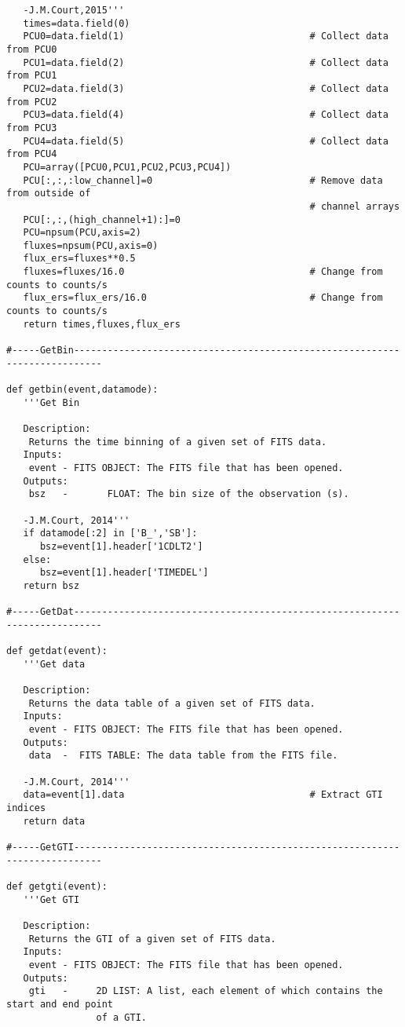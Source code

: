 \begin{verbatim}
   -J.M.Court,2015'''
   times=data.field(0)
   PCU0=data.field(1)                                 # Collect data from PCU0
   PCU1=data.field(2)                                 # Collect data from PCU1
   PCU2=data.field(3)                                 # Collect data from PCU2
   PCU3=data.field(4)                                 # Collect data from PCU3
   PCU4=data.field(5)                                 # Collect data from PCU4
   PCU=array([PCU0,PCU1,PCU2,PCU3,PCU4])
   PCU[:,:,:low_channel]=0                            # Remove data from outside of
                                                      # channel arrays
   PCU[:,:,(high_channel+1):]=0
   PCU=npsum(PCU,axis=2)
   fluxes=npsum(PCU,axis=0)
   flux_ers=fluxes**0.5
   fluxes=fluxes/16.0                                 # Change from counts to counts/s
   flux_ers=flux_ers/16.0                             # Change from counts to counts/s
   return times,fluxes,flux_ers

#-----GetBin---------------------------------------------------------------------------

def getbin(event,datamode):
   '''Get Bin
   
   Description:
    Returns the time binning of a given set of FITS data.
   Inputs:
    event - FITS OBJECT: The FITS file that has been opened.
   Outputs:
    bsz   -       FLOAT: The bin size of the observation (s).
    
   -J.M.Court, 2014'''
   if datamode[:2] in ['B_','SB']:
      bsz=event[1].header['1CDLT2']
   else:
      bsz=event[1].header['TIMEDEL']
   return bsz

#-----GetDat---------------------------------------------------------------------------

def getdat(event):
   '''Get data
   
   Description:
    Returns the data table of a given set of FITS data.
   Inputs:
    event - FITS OBJECT: The FITS file that has been opened.
   Outputs:
    data  -  FITS TABLE: The data table from the FITS file.
    
   -J.M.Court, 2014'''
   data=event[1].data                                 # Extract GTI indices
   return data

#-----GetGTI---------------------------------------------------------------------------

def getgti(event):
   '''Get GTI
   
   Description:
    Returns the GTI of a given set of FITS data.
   Inputs:
    event - FITS OBJECT: The FITS file that has been opened.
   Outputs:
    gti   -     2D LIST: A list, each element of which contains the start and end point
                of a GTI.
                

\end{verbatim}
